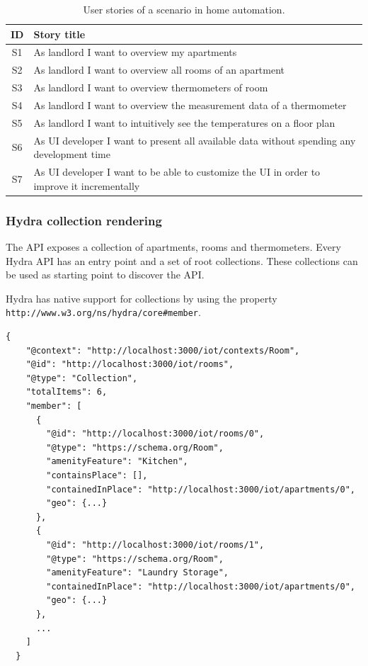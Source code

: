 \begin{table}[!htb]
  \begin{center}
    \begin{tabular}{ |c|l| }
      \hline
      \textbf{ID} & \textbf{Story title} \\
      \hline
      S1 & As landlord I want to overview my apartments \\
      \hline
      S2 & As landlord I want to overview all rooms of an apartment \\
      \hline
      S3 & As landlord I want to overview thermometers of room \\
      \hline
      S4 & As landlord I want to overview the measurement data of a thermometer \\
      \hline
      S5 & As landlord I want to intuitively see the temperatures on a floor plan \\
      \hline
      S6 & As UI developer I want to present all available data without spending any development time \\
      \hline
      S7 & As UI developer I want to be able to customize the UI in order to improve it incrementally \\
      \hline
    \end{tabular}
    \caption{User stories of a scenario in home automation.}
    \label{tab:usecase1}
  \end{center}
\end{table}

\subsubsection{Hydra collection rendering}
The API exposes a collection of apartments, rooms and thermometers. Every Hydra API has an entry point and a set of root collections. These collections can be used as starting point to discover the API.

Hydra has native support for collections by using the property \lstinline{http://www.w3.org/ns/hydra/core#member}.

\lstset{language=JSON}
\begin{lstlisting}[caption=Data of /rooms as Hydra collection.]
  {
    "@context": "http://localhost:3000/iot/contexts/Room",
    "@id": "http://localhost:3000/iot/rooms",
    "@type": "Collection",
    "totalItems": 6,
    "member": [
      {
        "@id": "http://localhost:3000/iot/rooms/0",
        "@type": "https://schema.org/Room",
        "amenityFeature": "Kitchen",
        "containsPlace": [],
        "containedInPlace": "http://localhost:3000/iot/apartments/0",
        "geo": {...}
      },
      {
        "@id": "http://localhost:3000/iot/rooms/1",
        "@type": "https://schema.org/Room",
        "amenityFeature": "Laundry Storage",
        "containedInPlace": "http://localhost:3000/iot/apartments/0",
        "geo": {...}
      },
      ...
    ]
  }
\end{lstlisting}

